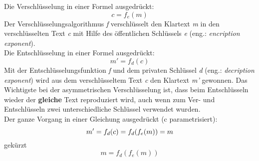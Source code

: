 Die Verschlüsselung in einer Formel ausgedrückt:\\
\begin{equation*}
  c = f_e (m)
  \label{eqn:asy_versch}
\end{equation*}
Der Verschlüsselungsalgorithmus \textit{f} verschlüsselt den Klartext \textit{m} in den verschlüsselten Text \textit{c} mit Hilfe des öffentlichen Schlüssels \textit{e} (eng.: \textit{encription exponent}).\\
Die Entschlüsselung in einer Formel ausgedrückt:
\begin{equation*}
  m' = f_d (c) 
  \label{eqn:asy_entsch}
\end{equation*}
Mit der Entschlüsselungsfunktion \textit{f} und dem privaten Schlüssel \textit{d} (eng.: \textit{decription exponent}) wird aus dem verschlüsseltem Text \textit{c} den Klartext \textit{m'} gewonnen.
%
Das Wichtigste bei der asymmetrischen Verschlüsselung ist, dass beim Entschlüsseln wieder der \textbf{gleiche} Text reproduziert wird, auch wenn zum Ver- und Entschlüsseln zwei unterschiedliche Schlüssel verwendet wurden.\\
Der ganze Vorgang in einer Gleichung ausgedrückt (c parametrisiert):
\begin{equation*}
  m' = f_d (c) = f_d (f_e (m) ) = m \\
  \label{eqn:asy_togh}
\end{equation*}
gekürzt\\
\begin{equation*}
  m = f_d ( f_e (m) )
  \label{eqn:asy_togh_shortForm}
\end{equation*}

